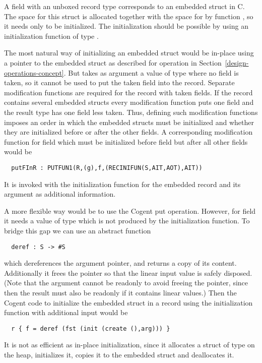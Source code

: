 A field  with an unboxed record type  corresponds to an embedded struct in C. The space for this struct is allocated together
with the space for  by function , so it needs only to be initialized. The initialization should be possible by using
an initialization function of type .

The most natural way of initializing an embedded struct would be in-place using a pointer to the embedded struct as described
for operation  in Section~\ref{design-operations-concept}. But  takes as argument a value of type 
where no field is taken, so it cannot be used to put the taken field  into the record. Separate modification functions
are required for the record with taken fields. If the record contains several embedded structs every modification function
puts one field and the result type has one field less taken. Thus, defining such modification functions imposes an order
in which the embedded structs must be initialized and whether they are initialized before or after the other fields. A corresponding
modification function for field  which must be initialized before field  but after all other fields would be
\begin{verbatim}
  putFInR : PUTFUN1(R,(g),f,(RECINIFUN(S,AIT,AOT),AIT))
\end{verbatim}
It is invoked with the initialization function for the embedded record and its argument 
as additional information.

A more flexible way would be to use the Cogent put operation. However, for field  it needs a value of type 
 which is not produced by the initialization function. To bridge this gap we can use an abstract function
\begin{verbatim}
  deref : S -> #S
\end{verbatim}
which dereferences the argument pointer, and returns a copy of its content. Additionally it frees the pointer so that the
linear input value is safely disposed. (Note that the argument cannot be readonly to avoid freeing the pointer, since then
the result must also be readonly if it contains linear values.) Then the Cogent code to initialize the embedded struct 
 in a record  using the initialization function  with additional input  would be
\begin{verbatim}
  r { f = deref (fst (init (create (),arg))) }
\end{verbatim}
It is not as efficient as in-place initialization, since it allocates a struct of type  on the heap, initializes it,
copies it to the embedded struct  and deallocates it.

